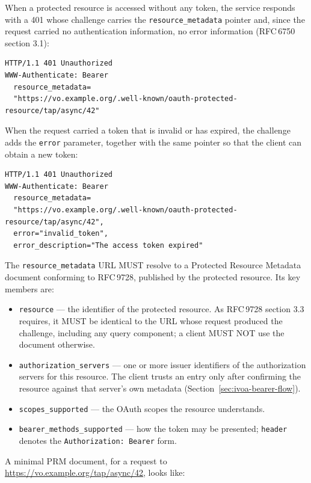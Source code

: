 \documentclass[11pt,a4paper]{ivoa}
\newcommand{\rfc}[1]{RFC\,#1}
\newcommand{\header}[1]{{\tt #1}}
\begin{document}
When a protected resource is accessed without any token, the service
responds with a 401 whose challenge carries the \verb|resource_metadata|
pointer and, since the request carried no authentication information, no
error information (\rfc{6750} section 3.1):

{\footnotesize
\begin{verbatim}
HTTP/1.1 401 Unauthorized
WWW-Authenticate: Bearer
  resource_metadata=
  "https://vo.example.org/.well-known/oauth-protected-resource/tap/async/42"
\end{verbatim}
}

When the request carried a token that is invalid or has expired, the
challenge adds the \verb|error| parameter, together with the same pointer so
that the client can obtain a new token:

{\footnotesize
\begin{verbatim}
HTTP/1.1 401 Unauthorized
WWW-Authenticate: Bearer
  resource_metadata=
  "https://vo.example.org/.well-known/oauth-protected-resource/tap/async/42",
  error="invalid_token",
  error_description="The access token expired"
\end{verbatim}
}

The \verb|resource_metadata| URL MUST resolve to a Protected Resource Metadata
document conforming to \rfc{9728}, published by the protected resource. Its key
members are:

\begin{itemize}
  \item \verb|resource| --- the identifier of the protected resource. As
        \rfc{9728} section 3.3 requires, it MUST be identical to the URL whose
        request produced the challenge, including any query component; a
        client MUST NOT use the document otherwise.
  \item \verb|authorization_servers| --- one or more issuer identifiers of the
        authorization servers for this resource. The client trusts an entry
        only after confirming the resource against that server's own metadata
        (Section~\ref{sec:ivoa-bearer-flow}).
  \item \verb|scopes_supported| --- the OAuth scopes the resource understands.
  \item \verb|bearer_methods_supported| --- how the token may be presented;
        \verb|header| denotes the \header{Authorization: Bearer} form.
\end{itemize}

A minimal PRM document, for a request to
\url{https://vo.example.org/tap/async/42}, looks like:
\end{document}
